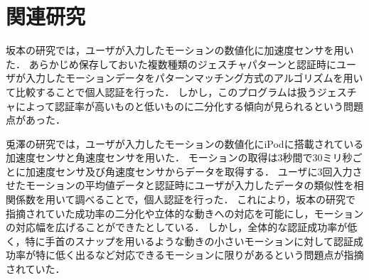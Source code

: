 \section{関連研究}
坂本の研究\cite{sakamoto}では，ユーザが入力したモーションの数値化に加速度センサを用いた．
あらかじめ保存しておいた複数種類のジェスチャパターンと認証時にユーザが入力したモーションデータをパターンマッチング方式のアルゴリズムを用いて比較することで個人認証を行った．
しかし，このプログラムは扱うジェスチャによって認証率が高いものと低いものに二分化する傾向が見られるという問題点があった．

兎澤の研究\cite{tozawa}では，ユーザが入力したモーションの数値化にiPodに搭載されている加速度センサと角速度センサを用いた．
モーションの取得は3秒間で30ミリ秒ごとに加速度センサ及び角速度センサからデータを取得する．
ユーザに3回入力させたモーションの平均値データと認証時にユーザが入力したデータの類似性を相関係数を用いて調べることで，個人認証を行った．
これにより，坂本の研究で指摘されていた成功率の二分化や立体的な動きへの対応を可能にし，モーションの対応幅を広げることができたとしている．
しかし，全体的な認証成功率が低く，特に手首のスナップを用いるような動きの小さいモーションに対して認証成功率が特に低く出るなど対応できるモーションに限りがあるという問題点が指摘されていた．

